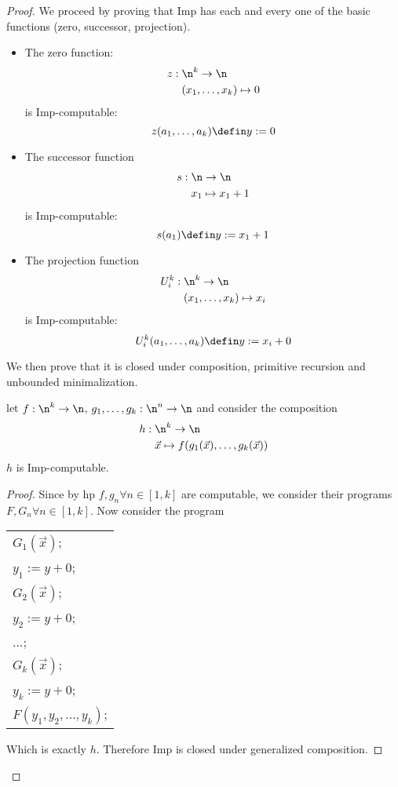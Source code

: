 \begin{proof}

  We proceed by proving that Imp has each and every one of the basic
  functions (zero, successor, projection).

  \begin{itemize}
  \item The zero function:
    \begin{align*}
      z : \; & \n^k \to \n \\
      & (x_1, \dots, x_k) \mapsto 0
    \end{align*}
    is Imp-computable: \[z(a_1,\dots,a_k) \defin y := 0\]
  \item The successor function
    \begin{align*}
      s : \; & \n \to \n \\
      & x_1 \mapsto x_1 + 1
    \end{align*}
    is Imp-computable: \[s(a_1) \defin y := x_1 + 1\]
  \item The projection function
    \begin{align*}
      U_i^k : \; & \n^k \to \n \\
      & (x_1,\dots,x_k) \mapsto x_i
    \end{align*}
    is Imp-computable: \[U_i^k(a_1, \dots, a_k) \defin y := x_i + 0\]
  \end{itemize}

  We then prove that it is closed under composition, primitive
  recursion and unbounded minimalization.

  \begin{lemma}
    let \(f : \n^k \to \n\), \(g_1,\dots,g_k : \n^n \to \n\) and
    consider the composition
    \begin{align*}
      h : \; & \n^k \to \n \\
      & \vec{x} \mapsto f(g_1(\vec{x}), \dots, g_k(\vec{x}))
    \end{align*}
    \(h\) is Imp-computable.
  \end{lemma}
  \begin{proof}
    Since by hp \(f, g_n \forall n\in [1,k]\) are computable, we
    consider their programs \(F, G_n\forall n \in [1,k]\). Now
    consider the program
    \begin{center}
      \begin{tabular}{l}
        \(G_1(\vec{x})\);\\[0pt]
        \(y_1 := y + 0\);\\[0pt]
        \(G_2(\vec{x})\);\\[0pt]
        \(y_2 := y + 0\);\\[0pt]
        \(\dots\);\\[0pt]
        \(G_k(\vec{x})\);\\[0pt]
        \(y_k := y + 0\);\\[0pt]
        \(F(y_1, y_2,\dots, y_k)\);\\[0pt]
      \end{tabular}
    \end{center}
    Which is exactly \(h\). Therefore Imp is closed under generalized
    composition.
  \end{proof}


\end{proof}

